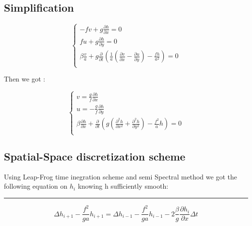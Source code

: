\documentclass[11pt,a4paper]{report}
\begin{document}
\begin{multicols*}{2}
    \subsection{Simplification}

    \begin{equation}
        \begin{cases}
            -fv + g \frac{\partial h}{\partial x} = 0                                                                                                          \\
            fu + g \frac{\partial h}{\partial y} = 0                                                                                                           \\
            \beta \frac{v}{a} + g \frac{\partial}{\partial t}(\frac{1}{a}(\frac{\partial v}{\partial x} - \frac{\partial u}{\partial y}) - \frac{fh}{a^2}) = 0 \\
        \end{cases}
    \end{equation}


    Then we got :

    \begin{equation}
        \begin{cases}
            v  = \frac{g}{f} \frac{\partial h}{\partial x}                                                                                                                    \\
            u  = -\frac{g}{f}\frac{\partial h}{\partial y}                                                                                                                    \\
            \beta \frac{\partial h}{\partial x} +  \frac{\partial}{\partial t}(g(\frac{\partial^2 h}{\partial x^2} + \frac{\partial^2 h}{\partial y^2}) - \frac{f^2}{a}h) = 0 \\
        \end{cases}
    \end{equation}


    \subsection{Spatial-Space discretization scheme}


    Using Leap-Frog time inegration scheme and semi Spectral method we got the following equation on $h_i$ knowing h sufficiently smooth:
    \begin{center}
        \rule{5cm}{1pt}
    \end{center}
    \begin{equation}
        \Delta h_{i+1} - \frac{f^2}{ga} h_{i+1} =  \Delta h_{i-1} -\frac{f^2}{ga}h_{i-1} - 2\frac{\beta}{g} \frac{\partial h_i}{\partial x}\Delta t
    \end{equation}



\end{multicols*}
\end{document}
